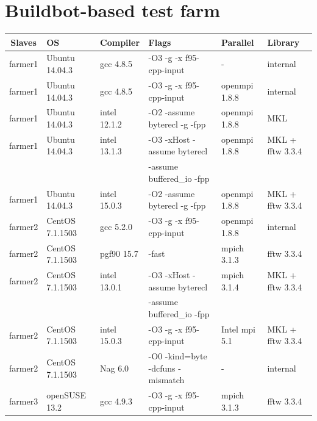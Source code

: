 \documentclass[final,3p,times,twocolumn]{elsarticle}
\begin{document}
\section{Buildbot-based test farm}\label{testfarm}

\begin{table}[t!]
 \begin{small}
 \begin{center}
   \begin{tabular}{c l l l l l }
   \hline
   \textbf{Slaves} &  \textbf{OS} & \textbf{Compiler} & \textbf{Flags} & \textbf{Parallel} & \textbf{Library} \\
   \hline  
\rowcolor{Gray}    
   farmer1 & Ubuntu 14.04.3  & gcc 4.8.5      & -O3 -g -x f95-cpp-input & -             & internal \\
   farmer1 & Ubuntu 14.04.3  & gcc 4.8.5      & -O3 -g -x f95-cpp-input & openmpi 1.8.8 & internal \\
\rowcolor{Gray}    
   farmer1 & Ubuntu 14.04.3  & intel 12.1.2   & -O2 -assume byterecl -g -fpp  & openmpi 1.8.8	 & MKL \\
   farmer1 & Ubuntu 14.04.3  & intel 13.1.3   & -O3 -xHost -assume byterecl  & openmpi 1.8.8	 & MKL + fftw 3.3.4 \\
           &                 &                & -assume  buffered\_io -fpp   &                 &                  \\
\rowcolor{Gray} 
   farmer1 & Ubuntu 14.04.3  & intel 15.0.3   & -O2 -assume byterecl -g -fpp	& openmpi 1.8.8	 & MKL + fftw 3.3.4 \\
   farmer2 & CentOS 7.1.1503 & gcc 5.2.0      & -O3 -g -x f95-cpp-input & openmpi 1.8.8 &  internal \\
\rowcolor{Gray} 
   farmer2 & CentOS 7.1.1503 & pgf90 15.7     & -fast & mpich 3.1.3 &  fftw 3.3.4 \\
   farmer2 & CentOS 7.1.1503 & intel 13.0.1   & -O3 -xHost -assume byterecl & mpich 3.1.4 & MKL + fftw 3.3.4 \\
           &                 &                & -assume  buffered\_io -fpp   &                 &                  \\
\rowcolor{Gray} 
   farmer2 & CentOS 7.1.1503 & intel 15.0.3   & -O3 -g -x f95-cpp-input & Intel mpi 5.1 & MKL + fftw 3.3.4 \\
   farmer2 & CentOS 7.1.1503 & Nag 6.0        & -O0 -kind=byte -dcfuns -mismatch & - & internal \\
\rowcolor{Gray} 
   farmer3 & openSUSE 13.2   & gcc 4.9.3      & -O3 -g -x f95-cpp-input & mpich 3.1.3 & fftw 3.3.4 \\

\end{tabular}
\end{center}
\end{small}
\end{table}
\end{document}
